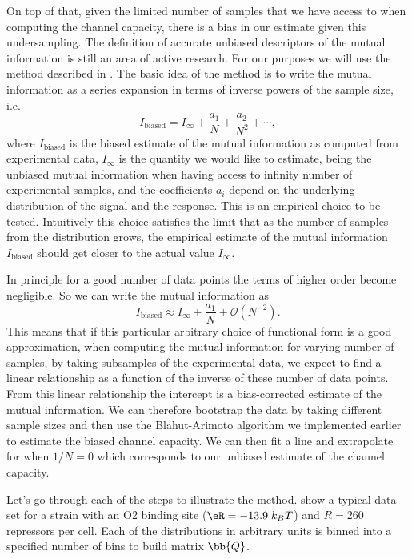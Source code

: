 On top of that, given the limited number of samples that we have access to when
computing the channel capacity, there is a bias in our estimate given this
undersampling. The definition of accurate unbiased descriptors of the mutual
information is still an area of active research. For our purposes we will use
the method described in \cite{Cheong2011a}. The basic idea of the method is to
write the mutual information as a series expansion in terms of inverse powers
of the sample size, i.e.
\begin{equation}
I_{\text{biased}} = I_\infty + \frac{a_1}{N} + \frac{a_2}{N^2} + \cdots,
\end{equation}
where $I_{\text{biased}}$ is the biased estimate of the mutual information as
computed from experimental data, $I_\infty$ is the quantity we would like to
estimate, being the unbiased mutual information when having access to infinity
number of experimental samples, and the coefficients $a_i$ depend on the
underlying distribution of the signal and the response. This is an empirical
choice to be tested. Intuitively this choice satisfies the limit that as the
number of samples from the distribution grows, the empirical estimate of the
mutual information $I_{\text{biased}}$ should get closer to the actual value
$I_\infty$.

In principle for a good number of data points the terms of higher order become
negligible. So we can write the mutual information as
\begin{equation}
I_{\text{biased}} \approx I_\infty + \frac{a_1}{N} + \mathcal{O}(N^{-2}).
\label{seq_mutual_biased}
\end{equation}
This means that if this particular arbitrary choice of functional form is  a
good approximation, when computing the mutual information for varying number of
samples, by taking subsamples of the experimental data, we expect to find a
linear relationship as a function of the inverse of these number of data
points. From this linear relationship the intercept is a bias-corrected
estimate of the mutual information. We can therefore bootstrap the data by
taking different sample sizes and then use the Blahut-Arimoto algorithm we
implemented earlier to estimate the biased channel capacity. We can then fit a
line and extrapolate for when $1/N = 0$ which corresponds to our unbiased
estimate of the channel capacity.

Let's go through each of the steps to illustrate the method.
 show a typical data set for a strain with an O2 binding
site ($\eR = -13.9 \; k_BT$) and $R = 260$ repressors per cell. Each of the
distributions in arbitrary units is binned into a specified number of bins to
build matrix $\bb{Q}$.

